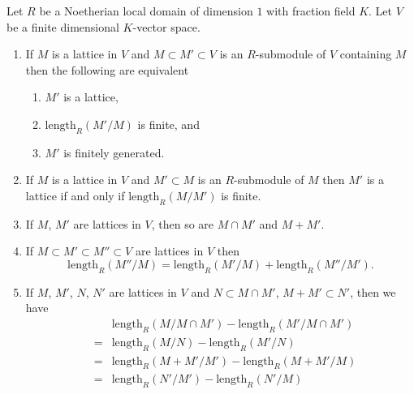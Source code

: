 \begin{lemma}
\label{lemma-compare-lattices}
Let $R$ be a Noetherian local domain of dimension $1$ with
fraction field $K$. Let $V$ be a finite dimensional $K$-vector space.
\begin{enumerate}
\item If $M$ is a lattice in $V$ and $M \subset M' \subset V$
is an $R$-submodule of $V$ containing $M$
then the following are equivalent
\begin{enumerate}
\item $M'$ is a lattice,
\item $\text{length}_R(M'/M)$ is finite, and
\item $M'$ is finitely generated.
\end{enumerate}
\item If $M$ is a lattice in $V$ and $M' \subset M$ is an $R$-submodule
of $M$ then $M'$ is a lattice if and only if
$\text{length}_R(M/M')$ is finite.
\item If $M$, $M'$ are lattices in $V$, then so are
$M \cap M'$ and $M + M'$.
\item If $M \subset M' \subset M'' \subset V$ are lattices in $V$
then
$$
\text{length}_R(M''/M) = 
\text{length}_R(M'/M) +
\text{length}_R(M''/M').
$$
\item If $M$, $M'$, $N$, $N'$ are lattices in $V$ and
$N \subset M \cap M'$, $M + M' \subset N'$, then we have
\begin{eqnarray*}
& &\text{length}_R(M/M \cap M') - \text{length}_R(M'/M \cap M')\\
& = &
\text{length}_R(M/N) - \text{length}_R(M'/N) \\
& = &
\text{length}_R(M + M' / M') - \text{length}_R(M + M'/M) \\
& = &
\text{length}_R(N' / M') - \text{length}_R(N'/M)
\end{eqnarray*}
\end{enumerate}
\end{lemma}

